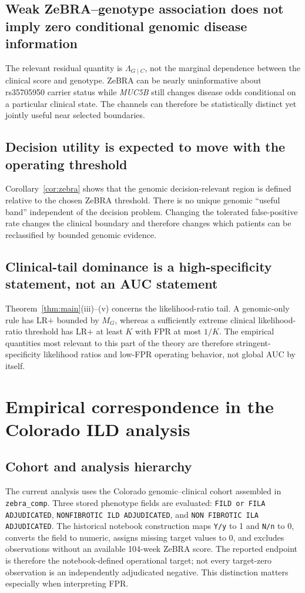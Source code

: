 \documentclass[journal]{IEEEtran}
\newcommand{\LR}{\Lambda}
\begin{document}
\subsection{Weak ZeBRA--genotype association does not imply zero conditional genomic disease information}
The relevant residual quantity is $\LR_{G\mid C}$, not the marginal dependence between the clinical score and genotype. ZeBRA can be nearly uninformative about rs35705950 carrier status while \textit{MUC5B} still changes disease odds conditional on a particular clinical state. The channels can therefore be statistically distinct yet jointly useful near selected boundaries.

\subsection{Decision utility is expected to move with the operating threshold}
Corollary~\ref{cor:zebra} shows that the genomic decision-relevant region is defined relative to the chosen ZeBRA threshold. There is no unique genomic ``useful band'' independent of the decision problem. Changing the tolerated false-positive rate changes the clinical boundary and therefore changes which patients can be reclassified by bounded genomic evidence.

\subsection{Clinical-tail dominance is a high-specificity statement, not an AUC statement}
Theorem~\ref{thm:main}(iii)--(v) concerns the likelihood-ratio tail. A genomic-only rule has LR$+$ bounded by $M_G$, whereas a sufficiently extreme clinical likelihood-ratio threshold has LR$+$ at least $K$ with FPR at most $1/K$. The empirical quantities most relevant to this part of the theory are therefore stringent-specificity likelihood ratios and low-FPR operating behavior, not global AUC by itself.

\section{Empirical correspondence in the Colorado ILD analysis}
\label{sec:empirical}

\subsection{Cohort and analysis hierarchy}
The current analysis uses the Colorado genomic--clinical cohort assembled in \texttt{zebra\_comp}. Three stored phenotype fields are evaluated: \texttt{FILD or FILA ADJUDICATED}, \texttt{NONFIBROTIC ILD ADJUDICATED}, and \texttt{NON FIBROTIC ILA ADJUDICATED}. The historical notebook construction maps \texttt{Y/y} to 1 and \texttt{N/n} to 0, converts the field to numeric, assigns missing target values to 0, and excludes observations without an available 104-week ZeBRA score. The reported endpoint is therefore the notebook-defined operational target; not every target-zero observation is an independently adjudicated negative. This distinction matters especially when interpreting FPR.
\end{document}
